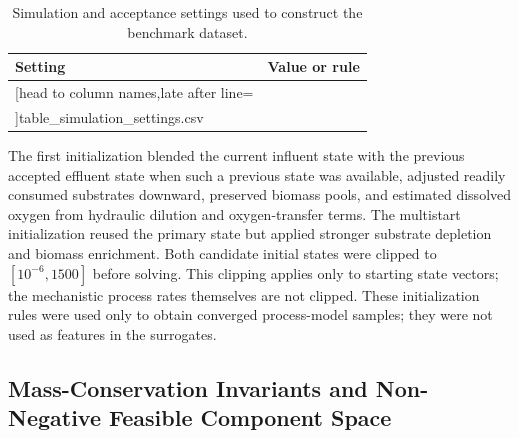 \documentclass[a4paper,fleqn]{cas-sc}
\newcommand{\csvrowstwo}[1]{%
  \csvreader[head to column names,late after line=\\]{#1}{}{\colA & \colB}}
\begin{document}
\begin{table}[htbp]
\centering
\caption{Simulation and acceptance settings used to construct the benchmark dataset.}
\label{tab:simulation_settings}
\scriptsize
\begin{tabular}{p{3.7cm}p{7.2cm}}
\hline
Setting & Value or rule \\
\hline
\csvrowstwo{table_simulation_settings.csv}
\hline
\end{tabular}
\end{table}

The first initialization blended the current influent state with the previous accepted effluent state when such a previous state was available, adjusted readily consumed substrates downward, preserved biomass pools, and estimated dissolved oxygen from hydraulic dilution and oxygen-transfer terms. The multistart initialization reused the primary state but applied stronger substrate depletion and biomass enrichment. Both candidate initial states were clipped to $[10^{-6},1500]$ before solving. This clipping applies only to starting state vectors; the mechanistic process rates themselves are not clipped. These initialization rules were used only to obtain converged process-model samples; they were not used as features in the surrogates.

\subsection{Mass-Conservation Invariants and Non-Negative Feasible Component Space}
\end{document}
